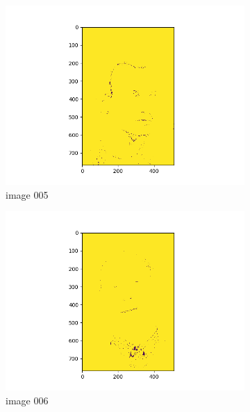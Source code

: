 \documentclass[11pt]{report}
\begin{document}
\begin{figure}[H]
\begin{subfigure}{0.3\textwidth}
        \centering
        \includegraphics[width=\textwidth]{Task 2 Plots/skin_color_mask_005.png}
        \caption{image 005}
        \label{fig:skin_colormask5}
    \end{subfigure}
    \begin{subfigure}{0.3\textwidth}
        \centering
        \includegraphics[width=\textwidth]{Task 2 Plots/skin_color_mask_006.png}
        \caption{image 006}
        \label{fig:skin_colormask6}
    \end{subfigure}
    \begin{subfigure}{0.3\textwidth}
        \centering

\end{subfigure}
\end{figure}
\end{document}
